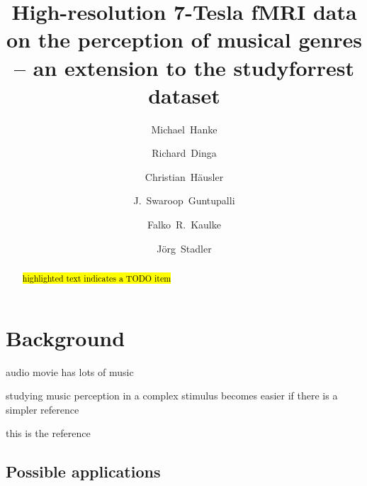 



\title{High-resolution 7-Tesla fMRI data on the perception of musical genres -- an extension to the studyforrest dataset}

\author[1,2]{Michael~Hanke}
\author[1]{Richard~Dinga}
\author[1]{Christian~Häusler}
\author[3]{J.~Swaroop~Guntupalli}
\author[1,4]{Falko~R.~Kaulke}
\author[5]{J\"org~Stadler}

\maketitle
\thispagestyle{fancy}

\begin{abstract}
\hl{highlighted text indicates a TODO item}
\end{abstract}
\clearpage

\section*{Background}

audio movie has lots of music

studying music perception in a complex stimulus becomes easier if there is a simpler reference

this is the reference

\cite{CTK+2012}

\subsection*{Possible applications}

